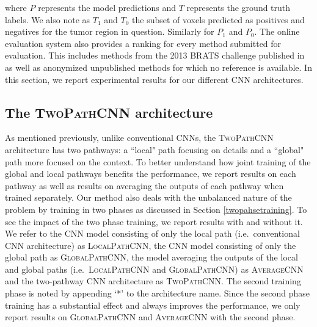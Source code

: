 \documentclass[final,5p,times,twocolumn]{elsarticle}
\begin{document}
where $P$ represents the model predictions and $T$ represents the ground truth labels. We also note as $T_1$ and $T_0$ the subset of voxels predicted as positives and negatives for the tumor region in question. Similarly for $P_1$ and $P_0$.  The online evaluation system also provides a ranking for every method submitted for evaluation. This includes methods from the 2013 BRATS challenge published in \citep{Menze2014} as well as anonymized unpublished methods for which no reference is available. In this section, we report experimental results for our different CNN architectures. 



\subsection{The \textsc{TwoPathCNN} architecture}



As mentioned previously, unlike conventional CNNs, the \textsc{TwoPathCNN} architecture has two pathways: a ``local" path focusing on details and a ``global" path more focused on the context. To better understand how joint training of the global and local pathways benefits the performance, we report results on each pathway as well as results on averaging the outputs of each pathway when trained separately. Our method also deals with the unbalanced nature of the problem by training in two phases as discussed in Section \ref{twopahsetraining}. To see the impact of the two phase training, we report results with and without it. We refer to the CNN model consisting of only the local path (i.e.\ conventional CNN architecture) as \textsc{LocalPathCNN}, the CNN model consisting of only the global path as \textsc{GlobalPathCNN}, the model averaging the outputs of the local and global paths (i.e.\ \textsc{LocalPathCNN} and \textsc{GlobalPathCNN}) as \textsc{AverageCNN} and the two-pathway CNN architecture as \textsc{TwoPathCNN}. The second training phase is noted by appending `*' to the architecture name. Since the second phase training has a substantial effect and always improves the performance, we only report results on  \textsc{GlobalPathCNN} and \textsc{AverageCNN} with the second phase.  
\end{document}
